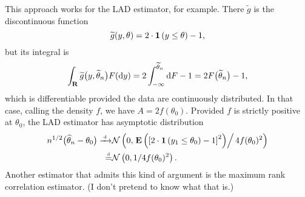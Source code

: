 \documentclass[11pt,letterpaper,reqno,oneside]{article}
\begin{document}
This approach works for the LAD estimator, for example. There $\widetilde{g}$ is the discontinuous function
%
\begin{equation*}
	\widetilde{g}(y,\theta) = 2 \cdot \boldsymbol{1}\left( y \leq \theta \right) - 1 ,
\end{equation*}
%
but its integral is
%
\begin{equation*}
	\int_{\mathbf{R}} \widetilde{g}\bigl( y, \widetilde{\theta}_n \bigr) F(\mathrm{d} y)
	= 2 \int_{-\infty}^{\widetilde{\theta}_n} \mathrm{d} F - 1 
	= 2 F\bigl(\widetilde{\theta}_n \bigr) - 1 ,
\end{equation*}
%
which is differentiable provided the data are continuously distributed. In that case, calling the density $f$, we have $A = 2 f(\theta_0)$. Provided $f$ is strictly positive at $\theta_0$, the LAD estimator has asymptotic distribution
%
\begin{align*}
	n^{1/2} \bigl( \widehat{\theta}_n - \theta_0 \bigr)
	\xrightarrow{{\scriptscriptstyle \mathrm{\;d\;}}}& \mathcal{N}\left( 0, 
	\left. \mathbf{E}\left( 
	\left[ 2 \cdot \boldsymbol{1}\left( y_1 \leq \theta_0 \right) - 1 \right]^2 \right) \right/
	4 f(\theta_0)^2 \right) 
	\\
	\protect\overset{{\scriptscriptstyle \mathrm{d}}}{=}& \mathcal{N}\left( 0, 1 / 4 f(\theta_0)^2 \right) .
\end{align*}
%
Another estimator that admits this kind of argument is the maximum rank correlation estimator. (I don't pretend to know what that is.)
\end{document}
